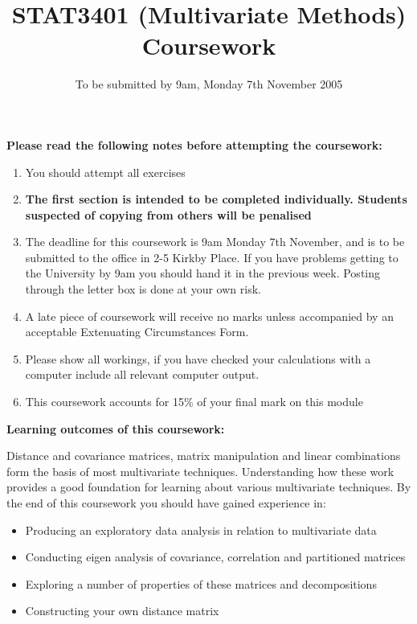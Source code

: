 \documentclass[11pt]{article}
\title{STAT3401 (Multivariate Methods) Coursework}
\author{To be submitted by 9am, Monday 7th November 2005}
\date{}
\begin{document}
\setlength{\parindent}{0pt}
\setlength{\parskip}{12pt}
\sffamily
\maketitle


\textbf{Please read the following notes before attempting the coursework:}

\begin{enumerate}

\item You should attempt all exercises
\item \textbf{The first section is intended to be completed individually.   Students suspected of copying from others will be penalised}
\item The deadline for this coursework is 9am Monday 7th November, and is to be submitted to the office in 2-5 Kirkby Place.   If you have problems getting to the University by 9am you should hand it in the previous week.   Posting through the letter box is done at your own risk.
\item A late piece of coursework will receive no marks unless accompanied by an acceptable Extenuating Circumstances Form.
\item Please show all workings, if you have checked your calculations with a computer include all relevant computer output.
\item This coursework accounts for 15\% of your final mark on this module
\end{enumerate}


\textbf{Learning outcomes of this coursework:}

Distance and covariance matrices, matrix manipulation and linear combinations form the basis of most multivariate techniques.   Understanding how these work provides a good foundation for learning about various multivariate techniques.   By the end of this coursework you should have gained experience in:

\begin{itemize}
\item Producing an exploratory data analysis in relation to multivariate data
\item Conducting eigen analysis of covariance, correlation and partitioned matrices
\item Exploring a number of properties of these matrices and decompositions
\item Constructing your own distance matrix
\end{itemize}
\end{document}
